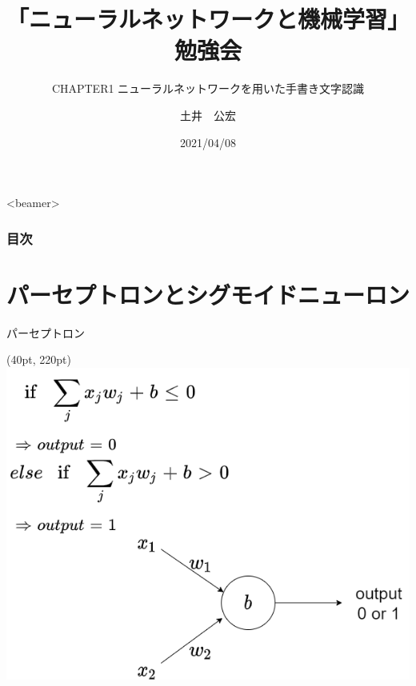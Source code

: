 \documentclass[t,dvipdfmx,10pt]{beamer}
\title[自主ゼミ]{「ニューラルネットワークと機械学習」勉強会}
\subtitle{CHAPTER1 ニューラルネットワークを用いた手書き文字認識}
\author[Kimihiro Doi]{土井　公宏}
\institute{}
\date[]{2021/04/08}
\begin{document}
\begin{frame}
 \titlepage 
\end{frame}

\begin{frame}<beamer>
  \frametitle{目次}
    \tableofcontents[] 
\end{frame}



\section{パーセプトロンとシグモイドニューロン}
\begin{frame}{パーセプトロン}
\begin{textblock*}{0.09\linewidth}(40pt, 220pt)
    \centering
    \includegraphics[width=\linewidth]{./パーセプトロン.png}
    
\end{textblock*}
    
\end{frame}
\end{document}
